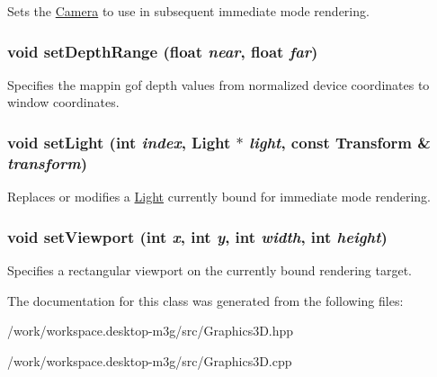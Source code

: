 Sets the \hyperlink{classm3g_1_1Camera}{Camera} to use in subsequent immediate mode rendering. \hypertarget{classm3g_1_1Graphics3D_6fc3837286f3516aa3320aeec9729495}{
\subsubsection[{setDepthRange}]{\setlength{\rightskip}{0pt plus 5cm}void setDepthRange (float {\em near}, \/  float {\em far})}}
\label{classm3g_1_1Graphics3D_6fc3837286f3516aa3320aeec9729495}


Specifies the mappin gof depth values from normalized device coordinates to window coordinates. \hypertarget{classm3g_1_1Graphics3D_2bf83cb69f50117dd9d5548fe96d0ab0}{
\subsubsection[{setLight}]{\setlength{\rightskip}{0pt plus 5cm}void setLight (int {\em index}, \/  {\bf Light} $\ast$ {\em light}, \/  const {\bf Transform} \& {\em transform})}}
\label{classm3g_1_1Graphics3D_2bf83cb69f50117dd9d5548fe96d0ab0}


Replaces or modifies a \hyperlink{classm3g_1_1Light}{Light} currently bound for immediate mode rendering. \hypertarget{classm3g_1_1Graphics3D_0b4ec48e9c19060e9be5648c118c23b1}{
\subsubsection[{setViewport}]{\setlength{\rightskip}{0pt plus 5cm}void setViewport (int {\em x}, \/  int {\em y}, \/  int {\em width}, \/  int {\em height})}}
\label{classm3g_1_1Graphics3D_0b4ec48e9c19060e9be5648c118c23b1}


Specifies a rectangular viewport on the currently bound rendering target. 

The documentation for this class was generated from the following files:\begin{CompactItemize}
\item 
/work/workspace.desktop-m3g/src/Graphics3D.hpp\item 
/work/workspace.desktop-m3g/src/Graphics3D.cpp\end{CompactItemize}
